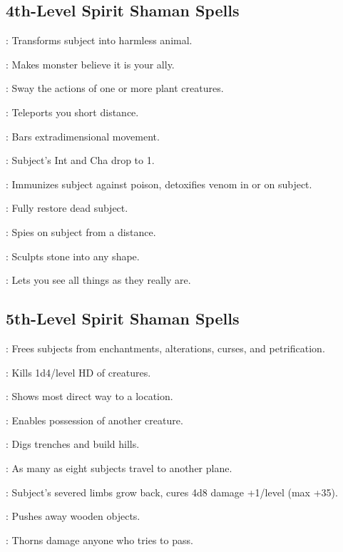 \begin{multicols}{2}
\subsection{4th-Level Spirit Shaman Spells}
\begin{description*}
\item[\linkspell{Baleful Polymorph}:] Transforms subject into harmless animal.
\item[\linkspell{Charm Monster}:] Makes monster believe it is your ally.
\item[\linkspell{Command Plants}:] Sway the actions of one or more plant creatures.
\item[\linkspell{Dimension Door}:] Teleports you short distance.
\item[\linkspell{Dimensional Anchor}:] Bars extradimensional movement. 
\item[\linkspell{Feeblemind}:] Subject’s Int and Cha drop to 1.
\item[\linkspell{Neutralize Poison}:] Immunizes subject against poison, detoxifies venom in or on subject.
\item[\linkspell{Resurrection}:] Fully restore dead subject.
\item[\linkspell{Scrying}:] Spies on subject from a distance.
\item[\linkspell{Stone Shape}:] Sculpts stone into any shape. 
\item[\linkspell{True Seeing}:] Lets you see all things as they really are.
\end{description*}

\subsection{5th-Level Spirit Shaman Spells}
\begin{description*}
\item[\linkspell{Break Enchantment}:] Frees subjects from enchantments, alterations, curses, and petrification.
\item[\linkspell{Circle of Death}:] Kills 1d4/level HD of creatures.
\item[\linkspell{Find the Path}:] Shows most direct way to a location.
\item[\linkspell{Magic Jar}:] Enables possession of another creature.
\item[\linkspell{Move Earth}:] Digs trenches and build hills. 
\item[\linkspell{Plane Shift}:] As many as eight subjects travel to another plane.
\item[\linkspell{Regenerate}:] Subject’s severed limbs grow back, cures 4d8 damage +1/level (max +35).
\item[\linkspell{Repel Wood}:] Pushes away wooden objects.
\item[\linkspell{Wall of Thorns}:] Thorns damage anyone who tries to pass.
\end{description*}


\end{multicols}

